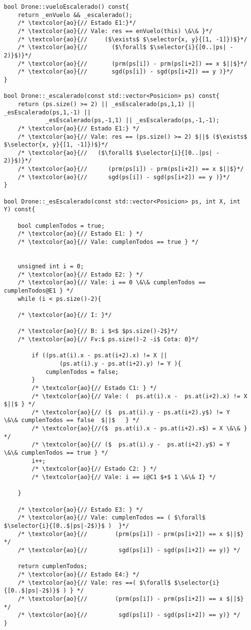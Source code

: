 \begin{lstlisting}
bool Drone::vueloEscalerado() const{
    return _enVuelo && _escalerado();
    /* \textcolor{ao}{// Estado E1:}*/
    /* \textcolor{ao}{// Vale: res == enVuelo(this) \&\& }*/
    /* \textcolor{ao}{//     ($\exists$ $\selector{x, y}{[1, -1]})$}*/
    /* \textcolor{ao}{//       ($\forall$ $\selector{i}{[0..|ps| - 2)}$)}*/
    /* \textcolor{ao}{//       (prm(ps[i]) - prm(ps[i+2]) == x $||$}*/
    /* \textcolor{ao}{//       sgd(ps[i]) - sgd(ps[i+2]) == y )}*/
}

bool Drone::_escalerado(const std::vector<Posicion> ps) const{
    return (ps.size() >= 2) || _esEscalerado(ps,1,1) || _esEscalerado(ps,1,-1) ||
            _esEscalerado(ps,-1,1) || _esEscalerado(ps,-1,-1);
    /* \textcolor{ao}{// Estado E1:} */
    /* \textcolor{ao}{// Vale: res == (ps.size() >= 2) $||$ ($\exists$ $\selector{x, y}{[1, -1]})$}*/
    /* \textcolor{ao}{//   ($\forall$ $\selector{i}{[0..|ps| - 2)}$)}*/
    /* \textcolor{ao}{//      (prm(ps[i]) - prm(ps[i+2]) == x $||$}*/
    /* \textcolor{ao}{//      sgd(ps[i]) - sgd(ps[i+2]) == y )}*/
}

bool Drone::_esEscalerado(const std::vector<Posicion> ps, int X, int Y) const{

    bool cumplenTodos = true;
    /* \textcolor{ao}{// Estado E1: } */
    /* \textcolor{ao}{// Vale: cumplenTodos == true } */


    unsigned int i = 0;
    /* \textcolor{ao}{// Estado E2: } */
    /* \textcolor{ao}{// Vale: i == 0 \&\& cumplenTodos == cumplenTodos@E1 } */
    while (i < ps.size()-2){
    
    /* \textcolor{ao}{// I: }*/
     
    /* \textcolor{ao}{// B: i $<$ $ps.size()-2$}*/
    /* \textcolor{ao}{// Fv:$ ps.size()-2 -i$ Cota: 0}*/

        if ((ps.at(i).x - ps.at(i+2).x) != X ||
                (ps.at(i).y - ps.at(i+2).y) != Y ){
            cumplenTodos = false;
        }
        /* \textcolor{ao}{// Estado C1: } */
        /* \textcolor{ao}{// Vale: (  ps.at(i).x -  ps.at(i+2).x) != X $||$ } */ 
        /* \textcolor{ao}{// ($  ps.at(i).y - ps.at(i+2).y$) != Y  \&\& cumplenTodos == false  $||$   } */ 
        /* \textcolor{ao}{//($  ps.at(i).x - ps.at(i+2).x$) = X \&\& } */ 
        /* \textcolor{ao}{// ($  ps.at(i).y -  ps.at(i+2).y$) = Y  \&\& cumplenTodos == true } */
        i++;
        /* \textcolor{ao}{// Estado C2: } */
        /* \textcolor{ao}{// Vale: i == i@C1 $+$ 1 \&\& I} */

    }
    
    /* \textcolor{ao}{// Estado E3: } */
    /* \textcolor{ao}{// Vale: cumplenTodos == ( $\forall$ $\selector{i}{[0..$|ps|-2$)}$ )  }*/
    /* \textcolor{ao}{//        (prm(ps[i]) - prm(ps[i+2]) == x $||$} */
    /* \textcolor{ao}{//         sgd(ps[i]) - sgd(ps[i+2]) == y)} */
 
    return cumplenTodos;
    /* \textcolor{ao}{// Estado E4:} */
    /* \textcolor{ao}{// Vale: res ==( $\forall$ $\selector{i}{[0..$|ps|-2$)}$ ) } */    
    /* \textcolor{ao}{//        (prm(ps[i]) - prm(ps[i+2]) == x $||$} */
    /* \textcolor{ao}{//         sgd(ps[i]) - sgd(ps[i+2]) == y)} */
}
\end{lstlisting}
